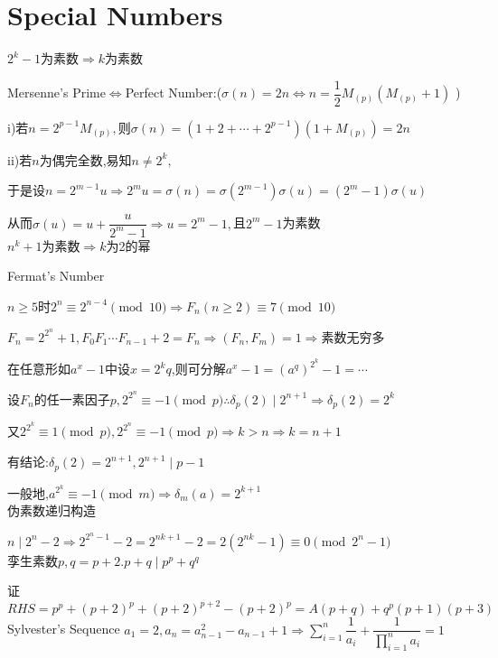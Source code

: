 
\section{Special Numbers}

$ 2^k-1$为素数$ \Rightarrow k$为素数 

Mersenne's Prime$ \Leftrightarrow $Perfect Number:($ \sigma(n)=2n \Leftrightarrow n=\dfrac{1}{2}M_{(p)}(M_{(p)}+1)$ )

i)若$ n=2^{p-1}M_{(p)},$则$ \sigma(n)=(1+2+\cdots+2^{p-1})(1+M_{(p)})=2n$

ii)若$ n$为偶完全数,易知$ n\ne 2^k,$

于是设$ n=2^{m-1}u\Rightarrow 2^mu=\sigma(n)=\sigma(2^{m-1})\sigma(u)=(2^m-1)\sigma(u)$

从而$ \sigma(u)=u+\dfrac{u}{2^m-1}\Rightarrow u=2^m-1,$且$ 2^m-1$为素数
\\

$ n^k+1$为素数$ \Rightarrow k$为2的幂

Fermat's Number

$ n\ge 5$时$ 2^n\equiv 2^{n-4} \pmod 10\Rightarrow F_n(n\ge 2)\equiv 7 \pmod 10$

$F_n=2^{2^n}+1,F_0F_1\cdots F_{n-1}+2=F_n\Rightarrow (F_n,F_m)=1 \Rightarrow $素数无穷多

在任意形如$ a^x-1$中设$ x=2^kq$,则可分解$ a^x-1=(a^q)^{2^k}-1=\cdots$

设$ F_n$的任一素因子$ p,2^{2^n}\equiv -1 \pmod p \therefore \delta_p(2)\mid 2^{n+1}\Rightarrow \delta_p(2)=2^k$

又$ 2^{2^k}\equiv 1 \pmod p,2^{2^n}\equiv -1 \pmod p\Rightarrow k>n\Rightarrow k=n+1$

有结论:$ \delta_p(2)=2^{n+1},2^{n+1}\mid p-1$

一般地,$ a^{2^k}\equiv -1 \pmod m\Rightarrow \delta_m(a)=2^{k+1}$
\\

伪素数递归构造

$ n \mid 2^n-2\Rightarrow 2^{2^n-1}-2=2^{nk+1}-2=2(2^{nk}-1)\equiv0\pmod{2^n-1}$
\\

孪生素数$ p,q=p+2.p+q\mid p^p+q^q$ 

证$RHS =p^p+(p+2)^p+(p+2)^{p+2}-(p+2)^p=A(p+q)+q^p(p+1)(p+3)$
\\

Sylvester's Sequence
$    a_1=2,a_n=a_{n-1}^2-a_{n-1}+1\Rightarrow \sum_{i=1}^{n}{\dfrac{1}{a_i}}+\dfrac{1}{\prod_{i=1}^{n}{a_i}}=1 $ 

